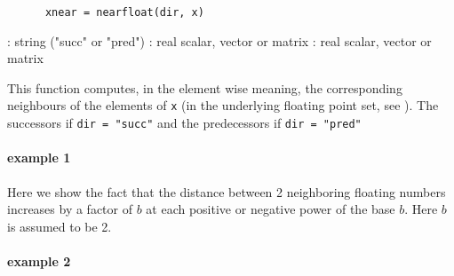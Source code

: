 

\begin{mandesc}
\end{mandesc}

\begin{calling_sequence}
    \begin{verbatim}
      xnear = nearfloat(dir, x)  
    \end{verbatim}
\end{calling_sequence}

\begin{parameters}
  \begin{varlist}
    : string ("succ" or "pred")
    : real scalar, vector or matrix
    : real scalar, vector or matrix
  \end{varlist}
\end{parameters}

\begin{mandescription}
    This function computes, in the element wise meaning, the corresponding neighbours 
    of the elements of \verb!x! (in the underlying floating point set,
    see ).
    The successors if \verb!dir = "succ"! and the predecessors if  \verb!dir = "pred"!
\end{mandescription}

\begin{examples}

\paragraph{example 1} Here we show the fact that the distance
between 2 neighboring floating numbers increases by a factor
of $b$ at each positive or negative power of the base $b$.
Here $b$ is assumed to be 2.   
\begin{program}
\end{program}

\paragraph{example 2}
\begin{program}
\end{program}

\end{examples}

